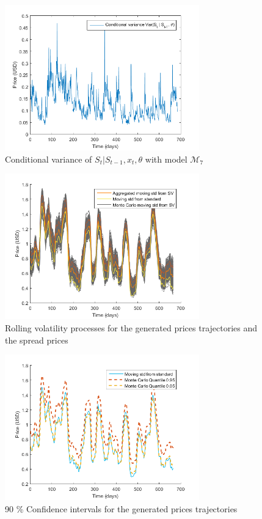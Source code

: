 \documentclass[11pt,a4,twosided,singlespacing,titlepagenumber=on]{scrreprt}
\numberwithin{equation}{chapter} %
\theoremstyle{remark}
\begin{document}
\begin{figure}[H]
\centering
\includegraphics[width = 0.75\textwidth]{model_vol/2}
\caption{Conditional variance of $S_t | S_{t-1}, x_t, \theta$ with model $\mathcal{M}_7$ }
\label{vol_mod_2}
\end{figure}

\begin{figure}[H]
\centering
\includegraphics[width = 0.75\textwidth]{model_vol/3}
\caption{Rolling volatility processes for the generated prices trajectories and the spread prices}
\label{vol_mod_3}
\end{figure}

\begin{figure}[H]
\centering
\includegraphics[width = 0.75\textwidth]{model_vol/4}
\caption{90 \% Confidence intervals for the generated prices trajectories}
\label{vol_mod_4}
\end{figure}
\end{document}
